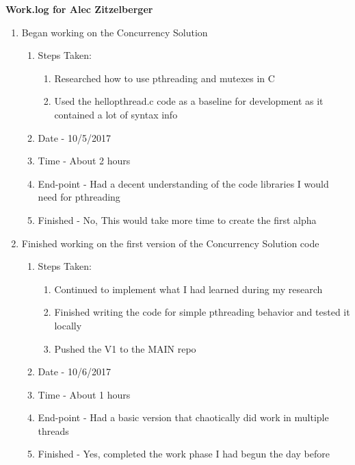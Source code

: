 \documentclass[letterpaper,10pt,fleqn]{article}
\begin{document}
\textbf{Work.log for Alec Zitzelberger}
\begin{enumerate}	
	\item Began working on the Concurrency Solution
		\begin{enumerate}
			\item Steps Taken:
				\begin{enumerate}
					\item Researched how to use pthreading and mutexes in C
					\item Used the hellopthread.c code as a baseline for development as it contained a lot of syntax info
				\end{enumerate}
			\item Date - 10/5/2017
			\item Time - About 2 hours
			\item End-point - Had a decent understanding of the code libraries I would need for pthreading
			\item Finished - No, This would take more time to create the first alpha
		\end {enumerate}
		
	\item Finished working on the first version of the Concurrency Solution code
		\begin{enumerate}
			\item Steps Taken:
				\begin{enumerate}
					\item Continued to implement what I had learned during my research
					\item Finished writing the code for simple pthreading behavior and tested it locally
					\item Pushed the V1 to the MAIN repo
				\end{enumerate}
			\item Date - 10/6/2017
			\item Time - About 1 hours
			\item End-point - Had a basic version that chaotically did work in multiple threads
			\item Finished - Yes, completed the work phase I had begun the day before
		\end {enumerate}
		

\end{enumerate}
\end{document}

